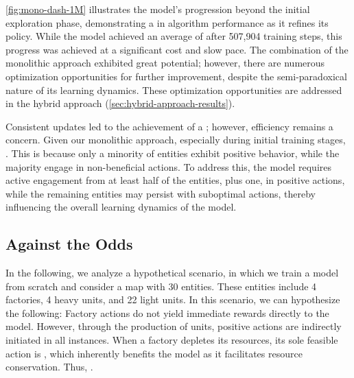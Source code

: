 \bigskip

\noindent \autoref{fig:mono-dash-1M} illustrates the model's progression beyond the initial exploration phase, demonstrating a  in algorithm performance as it refines its policy. While the model achieved an average of  after 507,904 training steps, this progress was achieved at a significant cost and slow pace. The combination of the monolithic approach exhibited great potential; however, there are numerous optimization opportunities for further improvement, despite the semi-paradoxical nature of its learning dynamics. These optimization opportunities are addressed in the hybrid approach (\autoref{sec:hybrid-approach-results}).

\bigskip

\noindent Consistent updates led to the achievement of a ; however, efficiency remains a concern. Given our monolithic approach, especially during initial training stages, . This is because only a minority of entities exhibit positive behavior, while the majority engage in non-beneficial actions. To address this, the model requires active engagement from at least half of the entities, plus one, in positive actions, while the remaining entities may persist with suboptimal actions, thereby influencing the overall learning dynamics of the model.

\bigskip

\subsection{Against the Odds}

\noindent In the following, we analyze a hypothetical scenario, in which we train a model from scratch and consider a map with 30 entities. These entities include 4 factories, 4 heavy units, and 22 light units. In this scenario, we can hypothesize the following: Factory actions do not yield immediate rewards directly to the model. However, through the production of units, positive actions are indirectly initiated in all instances. When a factory depletes its resources, its sole feasible action is , which inherently benefits the model as it facilitates resource conservation. Thus, .

\bigskip

